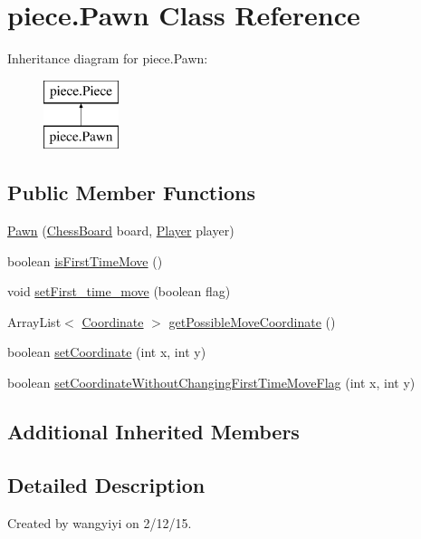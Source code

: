 \hypertarget{classpiece_1_1_pawn}{}\section{piece.\+Pawn Class Reference}
\label{classpiece_1_1_pawn}
Inheritance diagram for piece.\+Pawn\+:\begin{figure}[H]
\begin{center}
\leavevmode
\includegraphics[height=2.000000cm]{classpiece_1_1_pawn}
\end{center}
\end{figure}
\subsection*{Public Member Functions}
\begin{DoxyCompactItemize}
\item 
\hyperlink{classpiece_1_1_pawn_a4f7b4f8e849019f15398ed007e89e942}{Pawn} (\hyperlink{classchessboard_1_1_chess_board}{Chess\+Board} board, \hyperlink{enumchessboard_1_1_player}{Player} player)
\item 
boolean \hyperlink{classpiece_1_1_pawn_abcdb5bc7560887fe9061940650c27639}{is\+First\+Time\+Move} ()
\item 
void \hyperlink{classpiece_1_1_pawn_a17a752ab13fb24fcf69ceacdbd71f432}{set\+First\+\_\+time\+\_\+move} (boolean flag)
\item 
Array\+List$<$ \hyperlink{classpiece_1_1_coordinate}{Coordinate} $>$ \hyperlink{classpiece_1_1_pawn_aca9da51119ce8972a9897a69c3ef5033}{get\+Possible\+Move\+Coordinate} ()
\item 
boolean \hyperlink{classpiece_1_1_pawn_adaf68cbd144297f69817229018d54e36}{set\+Coordinate} (int x, int y)
\item 
boolean \hyperlink{classpiece_1_1_pawn_a266eebe5a89125e60a4eb9bb345bd16e}{set\+Coordinate\+Without\+Changing\+First\+Time\+Move\+Flag} (int x, int y)
\end{DoxyCompactItemize}
\subsection*{Additional Inherited Members}


\subsection{Detailed Description}
Created by wangyiyi on 2/12/15. 

